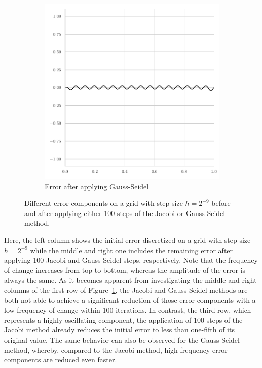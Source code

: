 \begin{figure}
\begin{subfigure}[b]{0.32\textwidth}
		\includegraphics[width=\textwidth]{figures/error_plots//final_error_gauss_seidel_32pi.pdf}
	\caption{Error after applying Gauss-Seidel}
	\end{subfigure}
	\caption{Different error components on a grid with step size $h = 2^{-9}$ before and after applying either 100 steps of the Jacobi or Gauss-Seidel method.}
	\label{fig:different-error-components}
\end{figure}
Here, the left column shows the initial error discretized on a grid with step size $h = 2^{-9}$ while the middle and right one includes the remaining error after applying 100 Jacobi and Gauss-Seidel steps, respectively.
Note that the frequency of change increases from top to bottom, whereas the amplitude of the error is always the same.
As it becomes apparent from investigating the middle and right columns of the first row of Figure~\ref{fig:different-error-components}, the Jacobi and Gauss-Seidel methods are both not able to achieve a significant reduction of those error components with a low frequency of change within 100 iterations.
In contrast, the third row, which represents a highly-oscillating component, the application of 100 steps of the Jacobi method already reduces the initial error to less than one-fifth of its original value.
The same behavior can also be observed for the Gauss-Seidel method, whereby, compared to the Jacobi method, high-frequency error components are reduced even faster.

